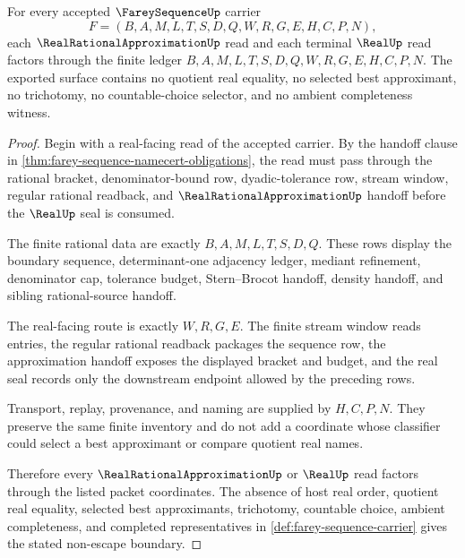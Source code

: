 \begin{theorem}
\label{thm:farey-sequence-real-approximation-ledger-nonescape}
For every accepted $\FareySequenceUp$ carrier
$$
F=(B,A,M,L,T,S,D,Q,W,R,G,E,H,C,P,N),
$$
each $\RealRationalApproximationUp$ read and each terminal $\RealUp$ read factors through the finite ledger $B,A,M,L,T,S,D,Q,W,R,G,E,H,C,P,N$. The exported surface contains no quotient real equality, no selected best approximant, no trichotomy, no countable-choice selector, and no ambient completeness witness.
\end{theorem}
\begin{proof}
Begin with a real-facing read of the accepted carrier. By the handoff clause in \autoref{thm:farey-sequence-namecert-obligations}, the read must pass through the rational bracket, denominator-bound row, dyadic-tolerance row, stream window, regular rational readback, and $\RealRationalApproximationUp$ handoff before the $\RealUp$ seal is consumed.

The finite rational data are exactly $B,A,M,L,T,S,D,Q$. These rows display the boundary sequence, determinant-one adjacency ledger, mediant refinement, denominator cap, tolerance budget, Stern--Brocot handoff, density handoff, and sibling rational-source handoff.

The real-facing route is exactly $W,R,G,E$. The finite stream window reads entries, the regular rational readback packages the sequence row, the approximation handoff exposes the displayed bracket and budget, and the real seal records only the downstream endpoint allowed by the preceding rows.

Transport, replay, provenance, and naming are supplied by $H,C,P,N$. They preserve the same finite inventory and do not add a coordinate whose classifier could select a best approximant or compare quotient real names.

Therefore every $\RealRationalApproximationUp$ or $\RealUp$ read factors through the listed packet coordinates. The absence of host real order, quotient real equality, selected best approximants, trichotomy, countable choice, ambient completeness, and completed representatives in \autoref{def:farey-sequence-carrier} gives the stated non-escape boundary.
\end{proof}


